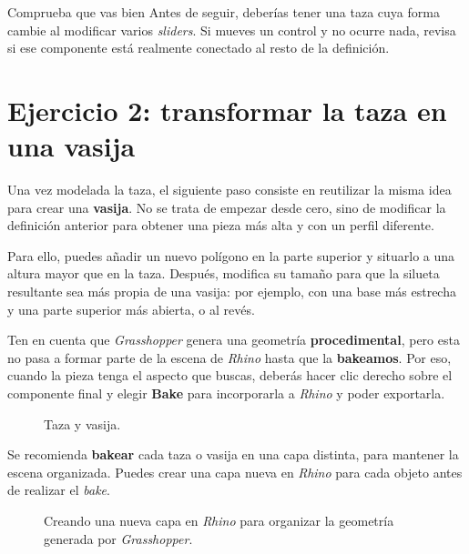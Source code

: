 \documentclass[
  spanish,
  11pt,
  a4paper,
  DIV=11,
  numbers=noendperiod]{scrartcl}
\begin{document}
\begin{PracticeTipBox}{Comprueba que vas bien}
Antes de seguir, deberías tener una taza cuya forma cambie al modificar varios \emph{sliders}. Si mueves un control y no ocurre nada, revisa si ese componente está realmente conectado al resto de la definición.
\end{PracticeTipBox}

\section{Ejercicio 2: transformar la taza en una vasija}
\label{ejercicio-2-transformar-la-taza-en-una-vasija}

Una vez modelada la taza, el siguiente paso consiste en reutilizar la misma idea para crear una \textbf{vasija}. No se trata de empezar desde cero, sino de modificar la definición anterior para obtener una pieza más alta y con un perfil diferente.

Para ello, puedes añadir un nuevo polígono en la parte superior y situarlo a una altura mayor que en la taza. Después, modifica su tamaño para que la silueta resultante sea más propia de una vasija: por ejemplo, con una base más estrecha y una parte superior más abierta, o al revés.

Ten en cuenta que \emph{Grasshopper} genera una geometría \textbf{procedimental}, pero esta no pasa a formar parte de la escena de \emph{Rhino} hasta que la \textbf{bakeamos}. Por eso, cuando la pieza tenga el aspecto que buscas, deberás hacer clic derecho sobre el componente final y elegir \textbf{Bake} para incorporarla a \emph{Rhino} y poder exportarla.

\begin{figure}[H]
\caption{Taza y vasija.}\label{fig-vasija}
\end{figure}

Se recomienda \textbf{bakear} cada taza o vasija en una capa distinta, para mantener la escena organizada. Puedes crear una capa nueva en \emph{Rhino} para cada objeto antes de realizar el \emph{bake}.

\begin{figure}[H]
\caption{Creando una nueva capa en \emph{Rhino} para organizar la geometría generada por \emph{Grasshopper}.}\label{fig-layers}
\end{figure}
\end{document}
